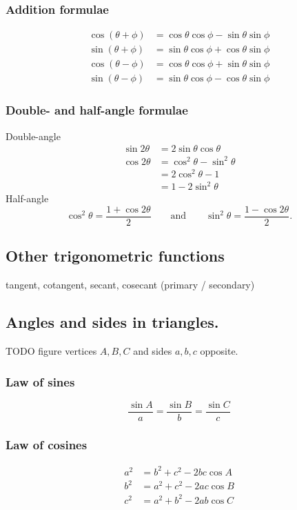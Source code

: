 \subsubsection{Addition formulae}
\begin{align*}
\cos(\theta+\phi) &= \cos\theta\cos\phi - \sin\theta\sin\phi \\
\sin(\theta+\phi) &= \sin\theta\cos\phi + \cos\theta\sin\phi \\
\cos(\theta-\phi) &= \cos\theta\cos\phi + \sin\theta\sin\phi \\
\sin(\theta-\phi) &= \sin\theta\cos\phi - \cos\theta\sin\phi
\end{align*}
\subsubsection{Double- and half-angle formulae}
Double-angle
\begin{align*}
\sin 2\theta &= 2\sin\theta\cos\theta \\
\cos 2\theta &= \cos^2\theta - \sin^2\theta \\
&= 2\cos^2\theta - 1 \\
&= 1- 2\sin^2\theta
\end{align*}
Half-angle
\[ \cos^2\theta = \frac{1+\cos 2\theta}{2} \qquad \text{and}\qquad \sin^2 \theta = \frac{1 - \cos 2\theta}{2}. \]
\subsection{Other trigonometric functions}
tangent, cotangent, secant, cosecant (primary / secondary)

\subsection{Angles and sides in triangles.}
TODO figure vertices $A,B,C$ and sides $a,b,c$ opposite.
\subsubsection{Law of sines}
\[ \frac{\sin A}{a} = \frac{\sin B}{b} = \frac{\sin C}{c} \]
\subsubsection{Law of cosines}
\begin{align*}
a^2 &= b^2 + c^2 - 2bc\cos A \\
b^2 &= a^2 + c^2 - 2ac\cos B \\
c^2 &= a^2 + b^2 - 2ab\cos C
\end{align*}

